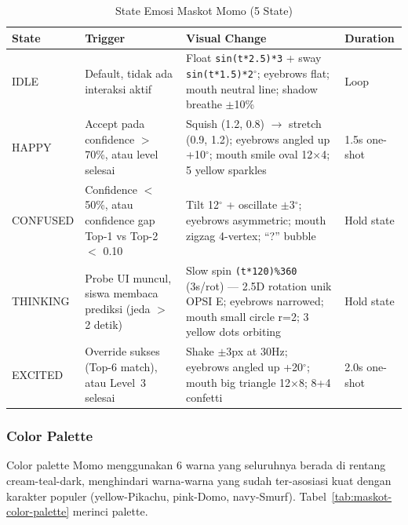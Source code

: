 \documentclass[12pt,a4paper,oneside,openany]{report}
\begin{document}
\begin{table}[H]
\centering
\caption{State Emosi Maskot Momo (5 State)}
\label{tab:maskot-state-emosi}
\begin{tabular}{|p{1.8cm}|p{4.5cm}|p{6cm}|p{1.8cm}|}
\hline
\textbf{State} & \textbf{Trigger} & \textbf{Visual Change} & \textbf{Duration} \\ \hline
IDLE & Default, tidak ada interaksi aktif & Float \texttt{sin(t*2.5)*3} + sway \texttt{sin(t*1.5)*2}$^\circ$; eyebrows flat; mouth neutral line; shadow breathe $\pm$10\% & Loop \\ \hline
HAPPY & Accept pada confidence $>$ 70\%, atau level selesai & Squish (1.2, 0.8) $\rightarrow$ stretch (0.9, 1.2); eyebrows angled up +10$^\circ$; mouth smile oval 12$\times$4; 5 yellow sparkles & 1.5s one-shot \\ \hline
CONFUSED & Confidence $<$ 50\%, atau confidence gap Top-1 vs Top-2 $<$ 0.10 & Tilt 12$^\circ$ + oscillate $\pm$3$^\circ$; eyebrows asymmetric; mouth zigzag 4-vertex; ``?'' bubble & Hold state \\ \hline
THINKING & Probe UI muncul, siswa membaca prediksi (jeda $>$ 2 detik) & Slow spin \texttt{(t*120)\%360} (3s/rot) --- 2.5D rotation unik OPSI E; eyebrows narrowed; mouth small circle r=2; 3 yellow dots orbiting & Hold state \\ \hline
EXCITED & Override sukses (Top-6 match), atau Level~3 selesai & Shake $\pm$3px at 30Hz; eyebrows angled up +20$^\circ$; mouth big triangle 12$\times$8; 8+4 confetti & 2.0s one-shot \\ \hline
\end{tabular}
\end{table}

\subsubsection{Color Palette}

Color palette Momo menggunakan 6 warna yang seluruhnya berada di rentang cream-teal-dark, menghindari warna-warna yang sudah ter-asosiasi kuat dengan karakter populer (yellow-Pikachu, pink-Domo, navy-Smurf). Tabel~\ref{tab:maskot-color-palette} merinci palette.
\end{document}
